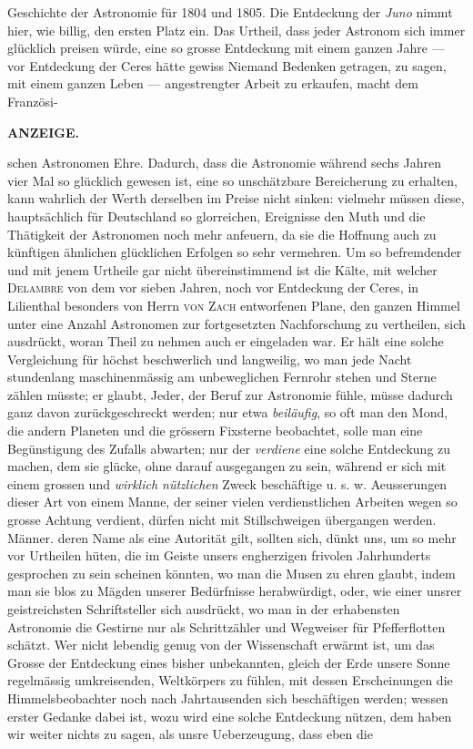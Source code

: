Geschichte der Astronomie für 1804 und 1805. Die Entdeckung der \emph{Juno} nimmt hier, wie billig, den ersten Platz ein. Das Urtheil, dass jeder Astronom sich immer glücklich preisen würde, eine so grosse Entdeckung mit einem ganzen Jahre --- vor Entdeckung der Ceres hätte gewiss Niemand Bedenken getragen, zu sagen, mit einem ganzen Leben --- angestrengter Arbeit zu erkaufen, macht dem Französi-\par
{}
\clearpage
\noindent{}%
%
\parbox[t]{\dimexpr\linewidth-24mm\relax}{\centering\footnotesize\bfseries ANZEIGE.\par}%
\makebox[12mm][r]{}\par\nobreak\medskip
\noindent schen Astronomen Ehre. Dadurch, dass die Astronomie während sechs Jahren vier Mal so glücklich gewesen ist, eine so unschätzbare Bereicherung zu erhalten, kann wahrlich der Werth derselben im Preise nicht sinken: vielmehr müssen diese, hauptsächlich für Deutschland so glorreichen, Ereignisse den Muth und die Thätigkeit der Astronomen noch mehr anfeuern, da sie die Hoffnung auch zu künftigen ähnlichen glücklichen Erfolgen so sehr vermehren. Um so befremdender und mit jenem Urtheile gar nicht übereinstimmend ist die Kälte, mit welcher \textsc{Delambre} von dem vor sieben Jahren, noch vor Entdeckung der Ceres, in Lilienthal besonders von Herrn \textsc{von Zach} entworfenen Plane, den ganzen Himmel unter eine Anzahl Astronomen zur fortgesetzten Nachforschung zu vertheilen, sich ausdrückt, woran Theil zu nehmen auch er eingeladen war. Er hält eine solche Vergleichung für höchst beschwerlich und langweilig, wo man jede Nacht stundenlang maschinenmässig am unbeweglichen Fernrohr stehen und Sterne zählen müsste; er glaubt, Jeder, der Beruf zur Astronomie fühle, müsse dadurch ganz davon zurückgeschreckt werden; nur etwa \emph{beiläufig}, so oft man den Mond, die andern Planeten und die grössern Fixsterne beobachtet, solle man eine Begünstigung des Zufalls abwarten; nur der \emph{verdiene} eine solche Entdeckung zu machen, dem sie glücke, ohne darauf ausgegangen zu sein, während er sich mit einem grossen und \emph{wirklich nützlichen} Zweck beschäftige u. s. w. Aeusserungen dieser Art von einem Manne, der seiner vielen verdienstlichen Arbeiten wegen so grosse Achtung verdient, dürfen nicht mit Stillschweigen übergangen werden. Männer. deren Name als eine Autorität gilt, sollten sich, dünkt uns, um so mehr vor Urtheilen hüten, die im Geiste unsers engherzigen frivolen Jahrhunderts gesprochen zu sein scheinen könnten, wo man die Musen zu ehren glaubt, indem man sie blos zu Mägden unserer Bedürfnisse herabwürdigt, oder, wie einer unsrer geistreichsten Schriftsteller sich ausdrückt, wo man in der erhabensten Astronomie die Gestirne nur als Schrittzähler und Wegweiser für Pfefferflotten schätzt. Wer nicht lebendig genug von der Wissenschaft erwärmt ist, um das Grosse der Entdeckung eines bisher unbekannten, gleich der Erde unsere Sonne regelmässig umkreisenden, Weltkörpers zu fühlen, mit dessen Erscheinungen die Himmelsbeobachter noch nach Jahrtausenden sich beschäftigen werden; wessen erster Gedanke dabei ist, wozu wird eine solche Entdeckung nützen, dem haben wir weiter nichts zu sagen, als unsre Ueberzeugung, dass eben die 